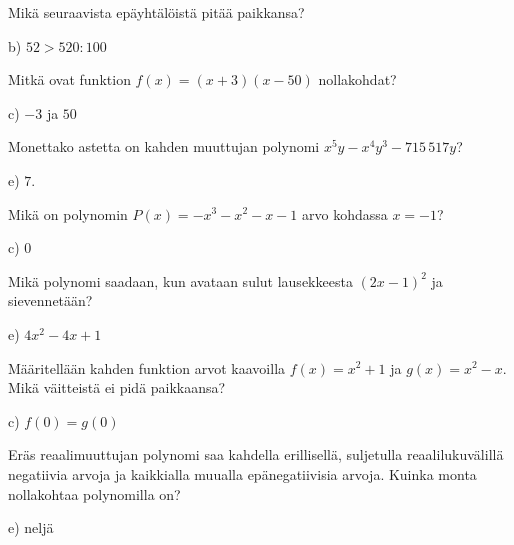 \begin{tehtava}
Mikä seuraavista epäyhtälöistä pitää paikkansa?
		\begin{vastaus}
b) $52 > 520:100$
	\end{vastaus}
\end{tehtava}

\begin{tehtava}
Mitkä ovat funktion $f(x)=(x+3)(x-50)$ nollakohdat?
		\begin{vastaus}
c) $-3$ ja $50$ %
	\end{vastaus}
\end{tehtava}

\begin{tehtava}
Monettako astetta on kahden muuttujan polynomi $x^5y-x^4y^3-715\,517y$?
		\begin{vastaus}
e) $7.$
	\end{vastaus}
\end{tehtava}

\begin{tehtava}
Mikä on polynomin $P(x)=-x^3-x^2-x-1$ arvo kohdassa $x=-1$?
		\begin{vastaus}
c) $0$
	\end{vastaus}
\end{tehtava}

\begin{tehtava}
Mikä polynomi saadaan, kun avataan sulut lausekkeesta $(2x-1)^2$ ja sievennetään?
		\begin{vastaus}
e) $4x^2-4x+1$
	\end{vastaus}
\end{tehtava}

\begin{tehtava}
Määritellään kahden funktion arvot kaavoilla $f(x) = x^2 + 1$ ja $g(x) = x^2 - x$. Mikä väitteistä ei pidä paikkaansa?
	\begin{vastaus}
	c) $f(0) = g(0)$
	\end{vastaus}
\end{tehtava}
\begin{tehtava}
Eräs reaalimuuttujan polynomi saa kahdella erillisellä, suljetulla reaalilukuvälillä negatiivia arvoja ja kaikkialla muualla epänegatiivisia arvoja. Kuinka monta nollakohtaa polynomilla on?
	\begin{vastaus}
	e) neljä
	\end{vastaus}
\end{tehtava}

